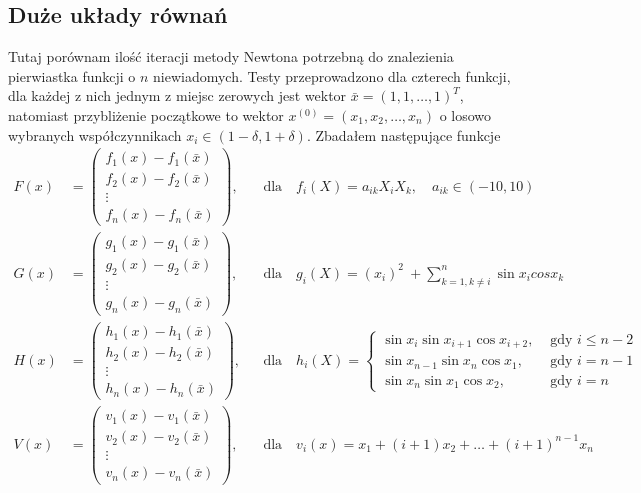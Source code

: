 \documentclass[11pt,wide]{mwart}
\begin{document}
\subsection{Duże układy równań}
Tutaj porównam ilość iteracji metody Newtona potrzebną do znalezienia pierwiastka funkcji o $ n $ niewiadomych. Testy przeprowadzono dla czterech funkcji, dla każdej z nich jednym z miejsc zerowych jest wektor $ \bar{x} = (1, 1, \ldots, 1)^T $, natomiast przybliżenie początkowe to wektor $ x^{(0)} = (x_1, x_2, \ldots, x_n )$ o losowo wybranych współczynnikach $ x_i \in (1-\delta, 1+\delta) $. Zbadałem następujące funkcje
\begin{align}
	F(x) &= 
	\left(\begin{matrix}
		f_1(x) - f_1(\bar{x}) \\ 
		f_2(x) - f_2(\bar{x}) \\ 
		\vdots\\ 
		f_n(x) - f_n(\bar{x})
	\end{matrix}\right), && \text{dla} \quad f_i(X) = a_{ik}X_iX_k, \quad a_{ik} \in (-10, 10) \label{eq:F}\\
	G(x) &=
	\left(\begin{matrix}
	g_1(x) - g_1(\bar{x}) \\ 
	g_2(x) - g_2(\bar{x}) \\ 
	\vdots\\ 
	g_n(x) - g_n(\bar{x})
\end{matrix}\right), && \text{dla} \quad g_i(X) = (x_i)^2\ + \sum_{k=1, k\neq i}^{n}\sin{x_i}cos{x_k} \label{eq:G}\\
	H(x) &= 
	\left(\begin{matrix}
	h_1(x) - h_1(\bar{x}) \\ 
	h_2(x) - h_2(\bar{x}) \\ 
	\vdots\\ 
	h_n(x) - h_n(\bar{x})
\end{matrix}\right), && \text{dla} \quad h_i(X) = 
		\begin{cases}  
			\sin{x_i}\sin{x_{i+1}}\cos{x_{i+2}}, & \text{ gdy } i \leq n-2 \\
			\sin{x_{n-1}}\sin{x_{n}}\cos{x_{1}}, & \text{ gdy } i = n - 1 \\
			\sin{x_n}\sin{x_{1}}\cos{x_{2}}, & \text{ gdy } i = n
		\end{cases} \label{eq:H} \\
	V(x) &=
	\left(\begin{matrix}
		v_1(x) - v_1(\bar{x}) \\ 
		v_2(x) - v_2(\bar{x}) \\ 
		\vdots\\ 
		v_n(x) - v_n(\bar{x})
	\end{matrix}\right), && \text{dla} \quad v_i(x) = x_1 + (i+1)x_2 + \ldots + (i+1)^{n-1}x_n \label{eq:V}
\end{align}
\end{document}
